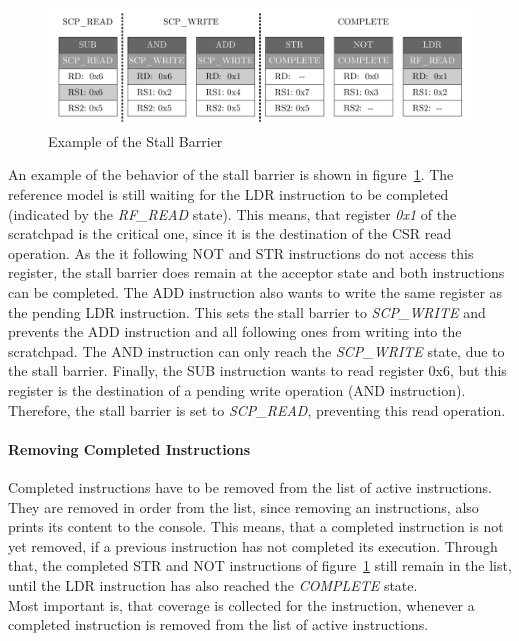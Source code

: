 \begin{figure}[htb]
 \centering
 \includegraphics[width=1.0\textwidth,angle=0]{images/stall_barrier_example}
 \caption{Example of the Stall Barrier}
\label{fig:stall_barrier_example}
\end{figure}

An example of the behavior of the stall barrier is shown in figure~\ref{fig:stall_barrier_example}.
The reference model is still waiting for the LDR instruction to be completed (indicated by the \emph{RF\_READ} state).
This means, that register \emph{0x1} of the scratchpad is the critical one, since it is the destination of the CSR read operation.
As the it following NOT and STR instructions do not access this register, the stall barrier does remain at the acceptor state and both instructions can be
completed.
The ADD instruction also wants to write the same register as the pending LDR instruction.
This sets the stall barrier to \emph{SCP\_WRITE} and prevents the ADD instruction and all following ones from writing into the scratchpad.
The AND instruction can only reach the \emph{SCP\_WRITE} state, due to the stall barrier.
Finally, the SUB instruction wants to read register 0x6, but this register is the destination of a pending write operation (AND instruction).
Therefore, the stall barrier is set to \emph{SCP\_READ}, preventing this read operation.

\paragraph{Removing Completed Instructions}

Completed instructions have to be removed from the list of active instructions.
They are removed in order from the list, since removing an instructions, also prints its content to the console.
This means, that a completed instruction is not yet removed, if a previous instruction has not completed its execution.
Through that, the completed STR and NOT instructions of figure~\ref{fig:stall_barrier_example} still remain in the list, until the LDR instruction has also
reached the \emph{COMPLETE} state.\\
Most important is, that coverage is collected for the instruction, whenever a completed instruction is removed from the list of active instructions.

